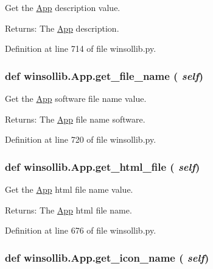 Get the \hyperlink{classwinsollib_1_1App}{App} description value. 

\begin{Desc}
\item[Returns:]The \hyperlink{classwinsollib_1_1App}{App} description. \end{Desc}


Definition at line 714 of file winsollib.py.\hypertarget{classwinsollib_1_1App_304caf3feb3151499528f5d77ef0b318}{
\subsubsection[get\_\-file\_\-name]{\setlength{\rightskip}{0pt plus 5cm}def winsollib.App.get\_\-file\_\-name ( {\em self})}}
\label{classwinsollib_1_1App_304caf3feb3151499528f5d77ef0b318}


Get the \hyperlink{classwinsollib_1_1App}{App} software file name value. 

\begin{Desc}
\item[Returns:]The \hyperlink{classwinsollib_1_1App}{App} file name software. \end{Desc}


Definition at line 720 of file winsollib.py.\hypertarget{classwinsollib_1_1App_369d463c4b77a4d98f449a4223bd03e3}{
\subsubsection[get\_\-html\_\-file]{\setlength{\rightskip}{0pt plus 5cm}def winsollib.App.get\_\-html\_\-file ( {\em self})}}
\label{classwinsollib_1_1App_369d463c4b77a4d98f449a4223bd03e3}


Get the \hyperlink{classwinsollib_1_1App}{App} html file name value. 

\begin{Desc}
\item[Returns:]The \hyperlink{classwinsollib_1_1App}{App} html file name. \end{Desc}


Definition at line 676 of file winsollib.py.\hypertarget{classwinsollib_1_1App_42df165647447b8ce9a48924f298fa6b}{
\subsubsection[get\_\-icon\_\-name]{\setlength{\rightskip}{0pt plus 5cm}def winsollib.App.get\_\-icon\_\-name ( {\em self})}}
\label{classwinsollib_1_1App_42df165647447b8ce9a48924f298fa6b}


